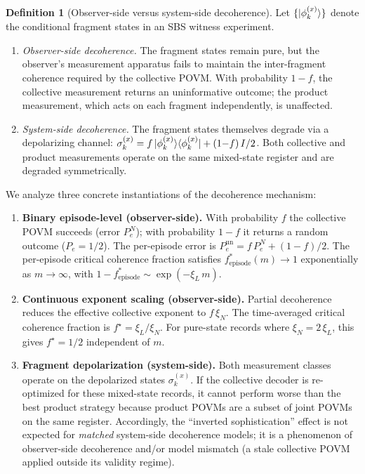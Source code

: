\documentclass[11pt]{article}
\newcommand{\1}{\mathbf{1}}
\newcommand{\QCBdist}{\xi}
\theoremstyle{definition}
\newtheorem{definition}{Definition}
\theoremstyle{plain}
\begin{document}
\begin{definition}[Observer-side versus system-side decoherence]
\label{def:decoherence-side}
Let $\{\ket{\phi_k^{(x)}}\}$ denote the conditional fragment states in an SBS witness experiment.
\begin{enumerate}[nosep,label=(\roman*)]
  \item \emph{Observer-side decoherence.}
    The fragment states remain pure, but the observer's measurement apparatus
    fails to maintain the inter-fragment coherence required by the collective
    POVM.  With probability $1{-}f$, the collective measurement returns an
    uninformative outcome; the product measurement, which acts on each
    fragment independently, is unaffected.
  \item \emph{System-side decoherence.}
    The fragment states themselves degrade via a depolarizing channel:
    $\sigma_k^{(x)} = f\ket{\phi_k^{(x)}}\!\bra{\phi_k^{(x)}}
    + (1{-}f)\,I/2$.
    Both collective and product measurements operate on the same mixed-state
    register and are degraded symmetrically.
\end{enumerate}
\end{definition}

We analyze three concrete instantiations of the decoherence mechanism:

\begin{enumerate}[leftmargin=2.2em,label=(\alph*)]
  \item \textbf{Binary episode-level (observer-side).}
    With probability $f$ the collective POVM succeeds (error $P_e^N$);
    with probability $1{-}f$ it returns a random outcome ($P_e = 1/2$).
    The per-episode error is $P_e^{\mathrm{un}} = f\,P_e^N + (1{-}f)/2$.
    The per-episode critical coherence fraction satisfies
    $f^*_{\mathrm{episode}}(m) \to 1$ exponentially as $m \to \infty$,
    with $1 - f^*_{\mathrm{episode}} \sim \exp(-\QCBdist_L\,m)$.

  \item \textbf{Continuous exponent scaling (observer-side).}
    Partial decoherence reduces the effective collective exponent to
    $f\,\QCBdist_N$.  The time-averaged critical coherence fraction is
    $f^\star = \QCBdist_L / \QCBdist_N$.  For pure-state records where
    $\QCBdist_N = 2\,\QCBdist_L$, this gives $f^\star = 1/2$
    independent of $m$.

  \item \textbf{Fragment depolarization (system-side).}
    Both measurement classes operate on the depolarized states
    $\sigma_k^{(x)}$.
    If the collective decoder is re-optimized for these mixed-state records, it cannot perform worse than the best product strategy because product POVMs are a subset of joint POVMs on the same register.
    Accordingly, the ``inverted sophistication'' effect is not expected for \emph{matched} system-side decoherence models; it is a phenomenon of observer-side decoherence and/or model mismatch (a stale collective POVM applied outside its validity regime).

\end{enumerate}
\end{document}
